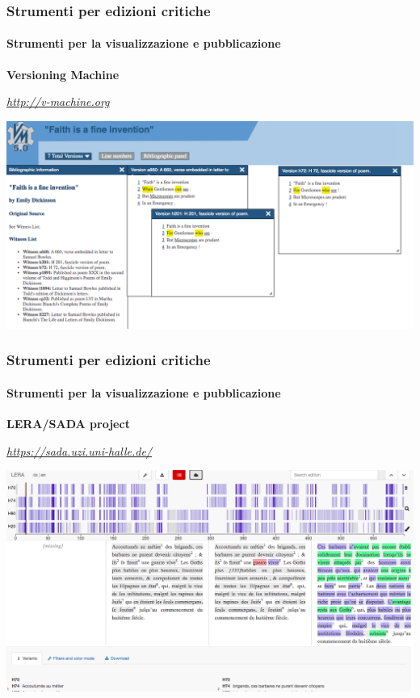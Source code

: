 \begin{frame}
    \frametitle{Strumenti per edizioni critiche}
    \framesubtitle{Strumenti per la visualizzazione e pubblicazione}
	\addtocounter{nframe}{1}
    \begin{center}
        \textbf{Versioning Machine}
    \end{center}
    \begin{center}
        \textit{\url{http://v-machine.org}}
	\end{center}
    \begin{center}
        \includegraphics[width=.95\textwidth]{imgs/v-machine.png}
	\end{center}
\end{frame}

\begin{frame}
    \frametitle{Strumenti per edizioni critiche}
    \framesubtitle{Strumenti per la visualizzazione e pubblicazione}
	\addtocounter{nframe}{1}
    \begin{center}
        \textbf{LERA/SADA project}
    \end{center}
    \begin{center}
        \textit{\url{https://sada.uzi.uni-halle.de/}}
	\end{center}
    \begin{center}
        \includegraphics[width=.95\textwidth]{imgs/lara.png}
	\end{center}
\end{frame}

